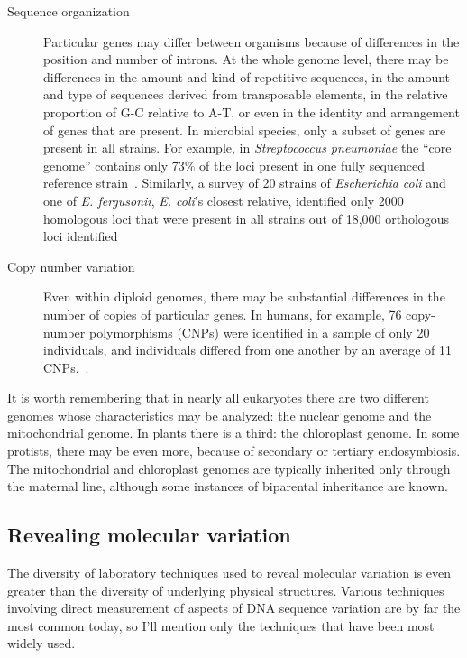 \begin{description}
\item[Sequence organization] Particular genes may differ between
  organisms because of differences in the position and number of
  introns. At the whole genome level, there may be differences in the
  amount and kind of repetitive sequences, in the amount and type of
  sequences derived from transposable elements, in the relative
  proportion of G-C relative to A-T, or even in the identity and
  arrangement of genes that are present. In microbial species, only a
  subset of genes are present in all strains. For example, in {\it
    Streptococcus pneumoniae\/} the ``core genome'' contains only 73\%
  of the loci present in one fully sequenced reference
  strain~\cite{Obert-etal-2006}. Similarly, a survey of 20 strains of
  {\it Escherichia coli\/} and one of {\it E. fergusonii\/}, {\it
    E. coli\/}'s closest relative, identified only 2000 homologous
  loci that were present in all strains out of 18,000 orthologous loci
  identified~\cite{Touchon-etal-2009} 

\item[Copy number variation] Even within diploid genomes, there may be
  substantial differences in the number of copies of particular
  genes. In humans, for example, 76 copy-number polymorphisms (CNPs)
  were identified in a sample of only 20 individuals, and individuals
  differed from one another by an average of 11
  CNPs.~\cite{Sebat-etal-2004}.

\end{description}

\noindent It is worth remembering that in nearly all eukaryotes there
are two different genomes whose characteristics may be analyzed: the
nuclear genome and the mitochondrial genome. In plants there is a
third: the chloroplast genome. In some protists, there may be even
more, because of secondary or tertiary endosymbiosis. The
mitochondrial and chloroplast genomes are typically inherited only
through the maternal line, although some instances of biparental
inheritance are known.

\subsection*{Revealing molecular variation}

The diversity of laboratory techniques used to reveal molecular
variation is even greater than the diversity of underlying physical
structures. Various techniques involving direct measurement of aspects
of DNA sequence variation are by far the most common today, so I'll
mention only the techniques that have been most widely
used.

